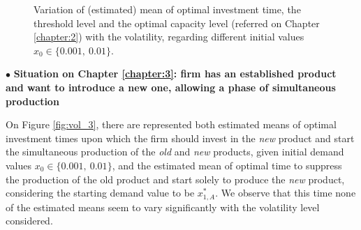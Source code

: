 \begin{figure}[!ht]
	\begin{subfigmatrix}{2}
	\end{subfigmatrix}
	\caption{Variation of (estimated) mean of optimal investment time, the threshold level and the optimal capacity level (referred on Chapter \ref{chapter:2}) with the volatility, regarding different initial values $x_0 \in \{0.001, \ 0.01\}$.}
	\label{fig:var_2}
\end{figure}



\vspace{3mm}
$\bullet$ \textbf{Situation on Chapter \ref{chapter:3}: firm has an established product and want to introduce a new one, allowing a phase of simultaneous production}


On Figure \ref{fig:vol_3}, there are represented both estimated means of optimal investment times upon which the firm should invest in the \textit{new} product and start the simultaneous production of the \textit{old} and \textit{new} products, given initial demand values $x_0 \in \{ 0.001, \ 0.01 \}$, and the estimated mean of optimal time to suppress the production of the old product and start solely to produce the \textit{new} product, considering the starting demand value to be $x_{1,A}^*$. We observe that this time none of the estimated means seem to vary significantly with the volatility level considered.



